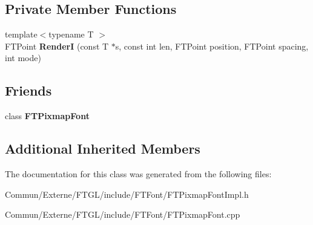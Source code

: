 \subsection*{Private Member Functions}
\begin{DoxyCompactItemize}
\item 
{\footnotesize template$<$typename T $>$ }\\F\+T\+Point {\bfseries RenderI} (const T $\ast$s, const int len, F\+T\+Point position, F\+T\+Point spacing, int mode)\hypertarget{class_f_t_pixmap_font_impl_afd1d206b81524928787019e9e0590684}{}\label{class_f_t_pixmap_font_impl_afd1d206b81524928787019e9e0590684}

\end{DoxyCompactItemize}
\subsection*{Friends}
\begin{DoxyCompactItemize}
\item 
class {\bfseries F\+T\+Pixmap\+Font}\hypertarget{class_f_t_pixmap_font_impl_ac7f382db9ff9f02888b67b7434d7edd4}{}\label{class_f_t_pixmap_font_impl_ac7f382db9ff9f02888b67b7434d7edd4}

\end{DoxyCompactItemize}
\subsection*{Additional Inherited Members}


The documentation for this class was generated from the following files\+:\begin{DoxyCompactItemize}
\item 
Commun/\+Externe/\+F\+T\+G\+L/include/\+F\+T\+Font/F\+T\+Pixmap\+Font\+Impl.\+h\item 
Commun/\+Externe/\+F\+T\+G\+L/include/\+F\+T\+Font/F\+T\+Pixmap\+Font.\+cpp\end{DoxyCompactItemize}
